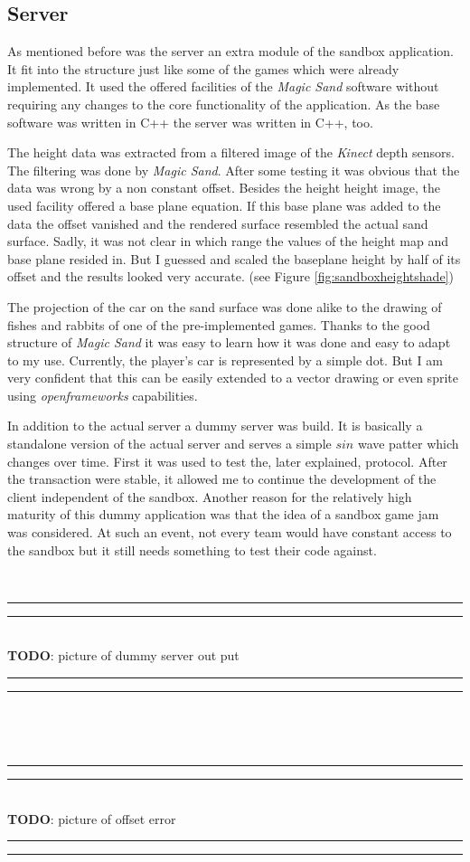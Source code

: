 \documentclass[12pt,a4paper,twoside,titlepage,headsepline,numbers=noenddot,listof=totoc,index=totoc,bibliography=totoc]{scrartcl}
\theoremstyle{break}
\providecommand{\TODO}[1]{{\small ~\\\hrule\vspace{0.1cm}\hrule~\\\textbf{TODO}:  #1~\\\hrule\vspace{0.1cm}\hrule~\\}}
\begin{document}
\subsection{Server}
As mentioned before was the server an extra module of the sandbox application. It fit into the structure just like some of the games which were already implemented. It used the offered facilities of the \textit{Magic Sand} software without requiring any changes to the core functionality of the application. As the base software was written in C++ the server was written in C++, too.

The height data was extracted from a filtered image of the \textit{Kinect} depth sensors. The filtering was done by \textit{Magic Sand}. After some testing it was obvious that the data was wrong by a non constant offset. Besides the height height image, the used facility offered a base plane equation. If this base plane was added to the data the offset vanished and the rendered surface resembled the actual sand surface. Sadly, it was not clear in which range the values of the height map and base plane resided in. But I guessed and scaled the baseplane height by half of its offset and the results looked very accurate. (see Figure \ref{fig:sandboxheightshade})

The projection of the car on the sand surface was done alike to the drawing of fishes and rabbits of one of the pre-implemented games. Thanks to the good structure of \textit{Magic Sand} it was easy to learn how it was done and easy to adapt to my use. Currently, the player's car is represented by a simple dot. But I am very confident that this can be easily extended to a vector drawing or even sprite using \textit{openframeworks} capabilities. 

In addition to the actual server a dummy server was build. It is basically a standalone version of the actual server and serves a simple $sin$ wave patter which changes over time. First it was used to test the, later explained, protocol. After the transaction were stable, it allowed me to continue the development of the client independent of the sandbox. Another reason for the relatively high maturity of this dummy application was that the idea of a sandbox game jam was considered. At such an event, not every team would have constant access to the sandbox but it still needs something to test their code against.

\TODO{picture of dummy server out put}
\TODO{picture of offset error}
\end{document}
